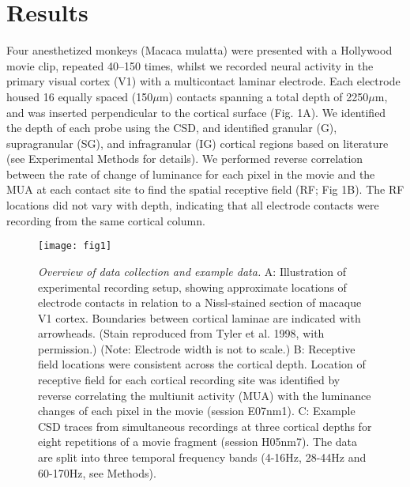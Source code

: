 \section{Results}
Four anesthetized monkeys (Macaca mulatta) were presented with a Hollywood movie clip, repeated 40--150 times, whilst we recorded neural activity in the primary visual cortex (V1) with a multicontact laminar electrode. Each electrode housed 16 equally spaced (150\hspace{0.2em}$\mu$m) contacts spanning a total depth of 2250\hspace{0.2em}$\mu$m, and was inserted perpendicular to the cortical surface (Fig. 1A). We identified the depth of each probe using the CSD, and identified granular (G), supragranular (SG), and infragranular (IG) cortical regions based on literature (see Experimental Methods for details). We performed reverse correlation between the rate of change of luminance for each pixel in the movie and the MUA at each contact site to find the spatial receptive field (RF; Fig 1B). The RF locations did not vary with depth, indicating that all electrode contacts were recording from the same cortical column.

\begin{figure}[htbp]
\centering \texttt{[image: fig1]}
%
\caption{%
\textit{Overview of data collection and example data.}
A: Illustration of experimental recording setup, showing approximate locations 
of electrode contacts in relation to a Nissl-stained section of macaque V1 
cortex. Boundaries between cortical laminae are indicated with arrowheads. 
(Stain reproduced from Tyler et al. 1998, with permission.) (Note: Electrode 
width is not to scale.)
B: Receptive field locations were consistent across the 
cortical depth. Location of receptive field for each cortical recording site 
was identified by reverse 
correlating the multiunit activity (MUA) with the luminance changes of each 
pixel in the movie (session E07nm1).
C: Example CSD traces from simultaneous recordings at three cortical depths for eight 
repetitions of a movie fragment (session H05nm7).
The data are split into three temporal frequency bands (4-16Hz, 
28-44Hz and 60-170Hz, see Methods).}%
\label{fig:lam_1}
%
\end{figure}

